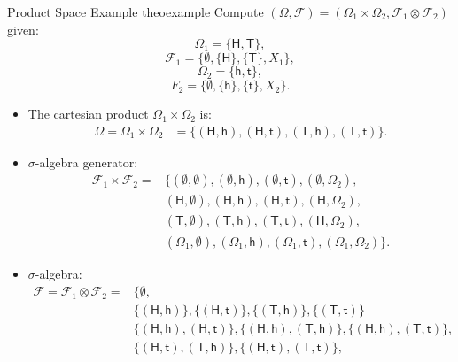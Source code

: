 \documentclass{tufte-handout}
\begin{document}
\begin{mybox}{Product Space Example  }{theoexample}
\small
Compute $(\Omega, \mathscr F) =(\Omega_1 \times \Omega_2, \mathscr F_1 \otimes \mathscr F_2)$ given:  $$\Omega_1=\{\mathsf H,\mathsf T\},$$ $$\mathscr F_1=\{\emptyset, \{\mathsf{H}\}, \{ \mathsf{T}\}, X_1 \},$$  $$\Omega_2=\{\mathsf h, \mathsf t\},$$
$$F_2=\{\emptyset, \{\mathsf{h}\}, \{ \mathsf{t}\}, X_2 \}.$$


\begin{itemize}
\item The cartesian product $\Omega_1\times \Omega_2$ is:
\begin{align*}
\Omega = \Omega_1\times \Omega_2 &= \{(\mathsf H, \mathsf h),(\mathsf H, \mathsf t),(\mathsf T, \mathsf h),( \mathsf T, \mathsf t)\}.
\end{align*} 
\item $\sigma$-algebra generator:
\begin{align*}
\mathscr F_1 \times  \mathscr F_2 = &\{ (\emptyset,\emptyset ), (\emptyset, \mathsf h), (\emptyset,\mathsf  t), (\emptyset, \Omega_2),\\
                                                           &(\mathsf H,\emptyset ), (\mathsf H,\mathsf h), (\mathsf H, \mathsf t), (\mathsf H,\Omega_2),\\
                                                           &(\mathsf T,\emptyset) ,  (\mathsf T, \mathsf h), (\mathsf T, \mathsf t), (\mathsf H,\Omega_2),\\
                                                           &(\Omega_1,\emptyset ), (\Omega_1, \mathsf h), (\Omega_1,\mathsf  t), (\Omega_1, \Omega_2)\}.
\end{align*}
\item $\sigma$-algebra:
\begin{align*}
\mathscr F = \mathscr F_1 \otimes \mathscr F_2  = &\{\emptyset, \\ 
                                   &\{ ( \mathsf H,  \mathsf  h)\}, \{ (  \mathsf H,  \mathsf t)\},  \{(  \mathsf  T,  \mathsf  h)\},  \{( \mathsf T, \mathsf   t)\}\\
                                   & \{( \mathsf H,  \mathsf  h), (\mathsf  H,\mathsf t)\},  \{( \mathsf H, \mathsf  h), ( \mathsf T, \mathsf  h)\},    \{(\mathsf H,  \mathsf h), ( \mathsf T,\mathsf t)\},\\ 
                                   &\{(\mathsf H,\mathsf t), (\mathsf T,\mathsf   h)\}, \{( \mathsf H,\mathsf t),(  \mathsf T,\mathsf  t)\},\\  

\end{align*}
\end{itemize}
\end{mybox}
\end{document}

